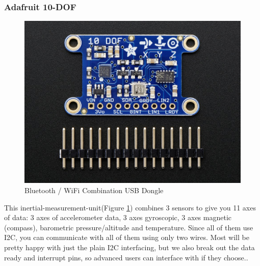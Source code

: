 \subsubsection{Adafruit 10-DOF} %
\label{ssub:adafruit_10_dof}
\begin{figure}[H]
\begin{center}
\captionsetup{font=small}
\includegraphics[scale=0.9]{pics/10dof.jpg}
\caption{Bluetooth / WiFi Combination USB Dongle}
\label{fig:10dof}
\end{center}
\end{figure}
This inertial-measurement-unit(Figure \ref{fig:10dof}) combines 3 sensors  to give you 11 axes of data: 3 axes of accelerometer data, 3 axes gyroscopic, 3 axes magnetic (compass), barometric pressure/altitude and temperature. Since all of them use I2C, you can communicate with all of them using only two wires. Most will be pretty happy with just the plain I2C interfacing, but we also break out the data ready and interrupt pins, so advanced users can interface with if they choose.\cite{ada_10dof}.
